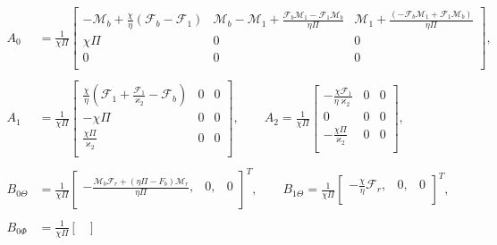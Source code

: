 \documentclass[main.tex]{subfiles}
\begin{document}
	\begin{align}
		A_{0}&= \frac{1}{\chi\Pi}\begin{bmatrix}
		-\mathcal{M}_b+ \frac{\chi}{\eta}(\mathcal{F}_b-\mathcal{F}_1)     & \mathcal{M}_b-\mathcal{M}_1+\frac{\mathcal{F}_b\mathcal{M}_1-\mathcal{F}_1\mathcal{M}_b}{\eta\Pi}            & \mathcal{M}_1+\frac{(-\mathcal{F}_b\mathcal{M}_1+\mathcal{F}_1\mathcal{M}_b)}{\eta\Pi} \\ 
		\chi\Pi    & 0             & 0            \\
		0     & 0             & 0            \\
		\end{bmatrix}, \nonumber \\\nonumber
		\\ \nonumber
		A_{1}&= \frac{1}{\chi\Pi}\begin{bmatrix}
		\frac{\chi}{\eta}(\mathcal{F}_1+\frac{\mathcal{F}_1}{\varkappa_2}-{\mathcal{F}_b})     & 0             & 0            \\
		-\chi\Pi     & 0             & 0            \\
		\frac{\chi\Pi}{\varkappa_2}    & 0             & 0            \\
		\end{bmatrix}, \qquad
		A_{2}= \frac{1}{\chi\Pi}\begin{bmatrix}
		-\frac{\chi \mathcal{F}_1}{\eta\varkappa_2}     & 0             & 0            \\
		0     & 0             & 0            \\
		-\frac{\chi\Pi}{\varkappa_2}     & 0             & 0            \\
		\end{bmatrix},\nonumber
		\\\nonumber
		\\ \nonumber
		B_{0\Theta}&= \frac{1}{\chi\Pi}\begin{bmatrix}
			- \frac{{{\mathcal{M}_b}{\mathcal{F}_r} + (\eta \Pi  - {F_b}){\mathcal{M}_r}}}{{\eta \Pi }},   & 0,             & 0           \\
		\end{bmatrix}^{T} , \qquad
		B_{1\Theta}= \frac{1}{\chi\Pi}\begin{bmatrix}
		-\frac{\chi}{\eta}\mathcal{F}_r ,    & 0,            & 0            \\
		\end{bmatrix}^{T}, 
		\\\nonumber
		\\ \nonumber
		B_{0\Phi}&= \frac{1}{\chi\Pi}\begin{bmatrix}

\end{bmatrix}
\end{align}
\end{document}
